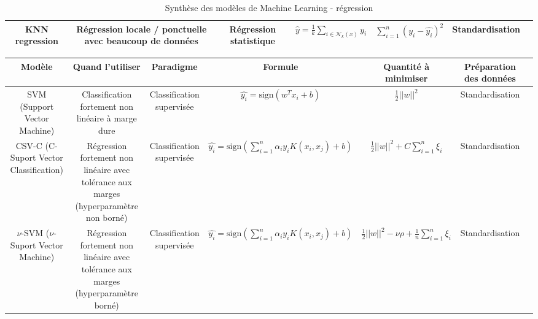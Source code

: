 \begin{table}[h!]
\begin{tabularx}{\textwidth}{|C|C|C|C|C|C|C|}
KNN regression                                     & Régression locale / ponctuelle avec beaucoup de données                                   & Régression statistique               & $\hat{y} = \frac{1}{k}\sum_{i \in \mathcal{N}_k(x)} y_i$                        & $\sum_{i=1}^{n}(y_i - \hat{y_i})^2$                                                                & Standardisation \\
\hline

\end{tabularx}
\caption{Synthèse des modèles de Machine Learning - régression}
\end{table}

\newpage

\begin{table}[h!]
\scriptsize
\begin{tabularx}{\textwidth}{|C|C|C|C|C|C|C|}
\hline
\textbf{Modèle}                                    & \textbf{Quand l'utiliser}                                                                 & \textbf{Paradigme}                   & \textbf{Formule}                                                                & \textbf{Quantité à minimiser}                                                                      & \textbf{Préparation des données}  \\
\hline

SVM (Support Vector Machine)                       & Classification fortement non linéaire à marge dure                                        & Classification supervisée            & $\hat{y_i} = \text{sign}({w^{T}x_{i} + b})$                                     & $\frac{1}{2}||w||^2$                                                                               & Standardisation \\
\hline

CSV-C (C-Suport Vector Classification)             & Régression fortement non linéaire avec tolérance aux marges (hyperparamètre non borné)    & Classification supervisée            & $\hat{y_i} = \text{sign}(\sum_{i=1}^{n} \alpha_{i}y_{i}K(x_{i},x_{j}) + b)$     & $\frac{1}{2}||w||^2 + C\sum_{i=1}^{n}\xi_{i}$                                                      & Standardisation \\
\hline

$\nu$-SVM ($\nu$-Suport Vector Machine)            & Régression fortement non linéaire avec tolérance aux marges (hyperparamètre borné)        & Classification supervisée            & $\hat{y_i} = \text{sign}( \sum_{i=1}^{n} \alpha_{i}y_{i}K(x_{i},x_{j}) + b)$    & $\frac{1}{2}||w||^2 - \nu \rho + \frac{1}{n}\sum_{i=1}^{n}\xi_{i}$                                 & Standardisation \\
\hline


\end{tabularx}
\end{table}
